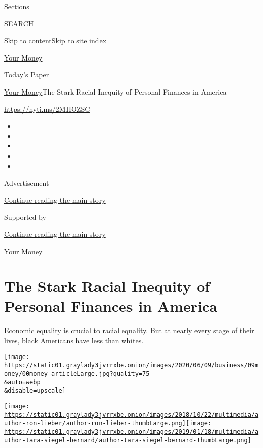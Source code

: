 Sections

SEARCH

\protect\hyperlink{site-content}{Skip to
content}\protect\hyperlink{site-index}{Skip to site index}

\href{https://www.nytimes3xbfgragh.onion/section/your-money}{Your Money}

\href{https://myaccount.nytimes3xbfgragh.onion/auth/login?response_type=cookie\&client_id=vi}{}

\href{https://www.nytimes3xbfgragh.onion/section/todayspaper}{Today's
Paper}

\href{/section/your-money}{Your Money}\textbar{}The Stark Racial
Inequity of Personal Finances in America

\url{https://nyti.ms/2MHOZSC}

\begin{itemize}
\item
\item
\item
\item
\item
\end{itemize}

Advertisement

\protect\hyperlink{after-top}{Continue reading the main story}

Supported by

\protect\hyperlink{after-sponsor}{Continue reading the main story}

Your Money

\hypertarget{the-stark-racial-inequity-of-personal-finances-in-america}{%
\section{The Stark Racial Inequity of Personal Finances in
America}\label{the-stark-racial-inequity-of-personal-finances-in-america}}

Economic equality is crucial to racial equality. But at nearly every
stage of their lives, black Americans have less than whites.

\texttt{[image: https://static01.graylady3jvrrxbe.onion/images/2020/06/09/business/09money/00money-articleLarge.jpg?quality=75\\\&auto=webp\\\&disable=upscale]}

\href{https://www.nytimes3xbfgragh.onion/by/ron-lieber}{\texttt{[image: https://static01.graylady3jvrrxbe.onion/images/2018/10/22/multimedia/author-ron-lieber/author-ron-lieber-thumbLarge.png]}}\href{https://www.nytimes3xbfgragh.onion/by/tara-siegel-bernard}{\texttt{[image: https://static01.graylady3jvrrxbe.onion/images/2019/01/18/multimedia/author-tara-siegel-bernard/author-tara-siegel-bernard-thumbLarge.png]}}

